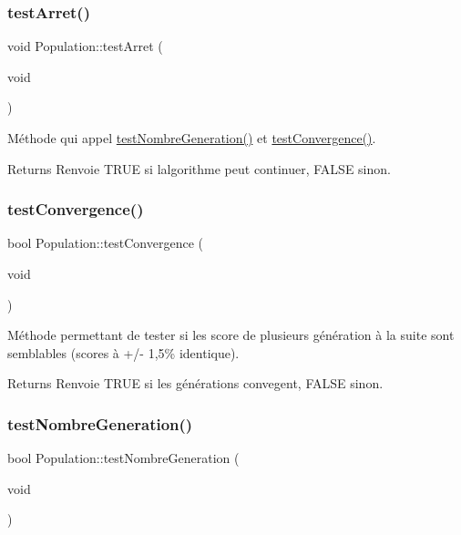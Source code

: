 \subsubsection{\texorpdfstring{test\+Arret()}{testArret()}}
{\footnotesize\ttfamily void Population\+::test\+Arret (\begin{DoxyParamCaption}\item[{void}]{ }\end{DoxyParamCaption})}



Méthode qui appel \hyperlink{class_population_a9192297f35ab0c6c6078ae087b3e4aee}{test\+Nombre\+Generation()} et \hyperlink{class_population_ae3511322c007fc85a8dd9bda0693b9cf}{test\+Convergence()}. 

\begin{DoxyReturn}{Returns}
Renvoie T\+R\+UE si l\textquotesingle{}algorithme peut continuer, F\+A\+L\+SE sinon. 
\end{DoxyReturn}
\mbox{\label{class_population_ae3511322c007fc85a8dd9bda0693b9cf}} 
\subsubsection{\texorpdfstring{test\+Convergence()}{testConvergence()}}
{\footnotesize\ttfamily bool Population\+::test\+Convergence (\begin{DoxyParamCaption}\item[{void}]{ }\end{DoxyParamCaption})}



Méthode permettant de tester si les score de plusieurs génération à la suite sont semblables (scores à +/-\/ 1,5\% identique). 

\begin{DoxyReturn}{Returns}
Renvoie T\+R\+UE si les générations convegent, F\+A\+L\+SE sinon. 
\end{DoxyReturn}
\mbox{\label{class_population_a9192297f35ab0c6c6078ae087b3e4aee}} 
\subsubsection{\texorpdfstring{test\+Nombre\+Generation()}{testNombreGeneration()}}
{\footnotesize\ttfamily bool Population\+::test\+Nombre\+Generation (\begin{DoxyParamCaption}\item[{void}]{ }\end{DoxyParamCaption})}



